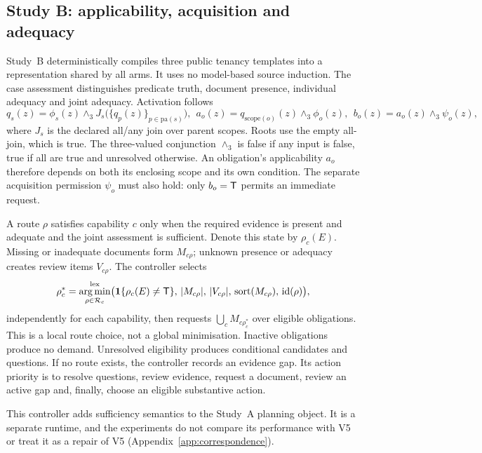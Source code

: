 \subsection{Study B: applicability, acquisition and adequacy}
\label{sec:native-method}
Study~B deterministically compiles three public tenancy templates into a
representation shared by all arms. It uses no model-based source induction.
The case assessment distinguishes predicate truth, document presence,
individual adequacy and joint adequacy. Activation follows
\begin{equation}
q_s(z)=\phi_s(z)\land_3 J_s\bigl(\{q_p(z)\}_{p\in\mathrm{pa}(s)}\bigr),\ \ 
a_o(z)=q_{\mathrm{scope}(o)}(z)\land_3\phi_o(z),\ \ 
b_o(z)=a_o(z)\land_3\psi_o(z),
\label{eq:native-activation}
\end{equation}
where $J_s$ is the declared all/any join over parent scopes. Roots use the
empty all-join, which is true. The three-valued conjunction $\land_3$ is
false if any input is false, true if all are true and unresolved otherwise.
An obligation's applicability $a_o$ therefore depends on both its enclosing
scope and its own condition. The separate acquisition permission $\psi_o$
must also hold: only $b_o=\mathsf{T}$ permits an immediate request.

A route $\rho$ satisfies capability $c$ only when the required evidence is
present and adequate and the joint assessment is sufficient. Denote this
state by $\rho_c(E)$. Missing or inadequate documents form $M_{c\rho}$;
unknown presence or adequacy creates review items $V_{c\rho}$. The
controller selects
\begin{equation}
\rho_c^*=\operatorname*{arg\,min}^{\rm lex}_{\rho\in\mathcal R_c}
\bigl(\mathbf 1\{\rho_c(E)\ne\mathsf{T}\},\,|M_{c\rho}|,\,|V_{c\rho}|,\,
\operatorname{sort}(M_{c\rho}),\,\operatorname{id}(\rho)\bigr),
\label{eq:native-route}
\end{equation}
independently for each capability, then requests
$\bigcup_c M_{c\rho_c^*}$ over eligible obligations. This is a local route
choice, not a global minimisation. Inactive obligations produce no demand.
Unresolved eligibility produces conditional candidates and questions.
If no route exists, the controller records an evidence gap. Its action
priority is to resolve questions, review evidence, request a document,
review an active gap and, finally, choose an eligible substantive action.

This controller adds sufficiency semantics to the Study~A planning object.
It is a separate runtime, and the experiments do not compare its performance
with V5 or treat it as a repair of V5 (Appendix~\ref{app:correspondence}).
